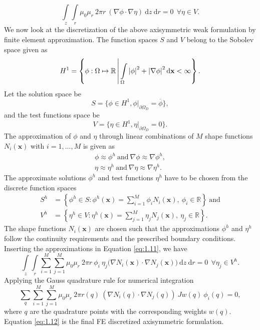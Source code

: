 \begin{equation}
\int\limits_{z} \int\limits_{r} \mu_0 \mu_r \ 2 \pi r \ (\nabla \phi \cdot \nabla \eta) \ \mathrm{d}z \ \mathrm{d}r = 0 \ \ \forall \eta \in V.
\label{eq:1.11}
\end{equation}
We now look at the discretization of the above axisymmetric weak formulation by finite element approximation. The function spaces $S$ and $V$ belong to the Sobolev space given as
\begin{equation}
H^1 = \left\lbrace \phi : \Omega \mapsto \mathbb{R} \,\middle\vert\, \int\limits_{\Omega} \left\lvert \phi \right\rvert^2 + \left\lvert \nabla \phi \right\rvert^2 \mathrm{d}\mathbf{x} < \infty \right\rbrace.
\end{equation}
Let the solution space be
\begin{equation}
S = \{ \phi \in H^1, \phi|_{\partial \Omega_{D}} = \overline{\phi} \},
\end{equation}
and the test functions space be
\begin{equation}
V = \{ \eta \in H^1, \eta|_{\partial \Omega_{D}} = 0\}.
\end{equation}
The approximation of $\phi$ and $\eta$ through linear combinations of $M$ shape functions $N_i (\mathbf{x})$ with $i =1,...,M$ is given as
\begin{align}
\phi \approx \phi^h \ \text{and} \ \nabla \phi \approx \nabla \phi^h, \nonumber\\
\eta \approx \eta^h \ \text{and} \ \nabla \eta \approx \nabla \eta^h.
\end{align}
The approximate solutions $\phi^h$ and test functions $\eta^h$ have to be chosen from the discrete function spaces 
\begin{align}
S^h &= \left\{\phi^h \in S : \phi^h(\textbf{x}) = \sum_{i=1}^{\textit{M}} \phi_i N_i (\textbf{x}), \ \phi_i \in \mathbb{R} \right\} \ \text{and} \nonumber\\
V^h &= \left\{\eta^h \in V : \eta^h(\textbf{x}) = \sum_{j=1}^{\textit{M}} \eta_j N_j (\textbf{x}), \ \eta_j \in \mathbb{R} \right\}.
\end{align}
The shape functions $N_i (\mathbf{x})$ are chosen such that the approximations $\phi^h$ and $\eta^h$ follow the continuity requirements and the prescribed boundary conditions. Inserting the approximations in Equation \eqref{eq:1.11}, we have
\begin{equation}
\int\limits_{z} \int\limits_{r} \sum\limits_{i=1}^{M} \sum\limits_{j=1}^{M} \mu_0 \mu_r \ 2 \pi r \ \phi_i \ \eta_j \Big( \nabla N_i (\mathbf{x}) \cdot \nabla N_j (\mathbf{x}) \Big) \ \mathrm{d}z \ \mathrm{d}r = 0 \ \ \forall \eta_j \in V^h.
\end{equation}
Applying the Gauss quadrature rule for numerical integration
\begin{equation}
\sum\limits_{q} \sum\limits_{i=1}^{M} \sum\limits_{j=1}^{M} \mu_0 \mu_r \ 2 \pi r(q) \ (\nabla N_i (q) \cdot \nabla N_j (q)) \ J w(q) \ \phi_i(q)= 0,
\label{eq:1.12}
\end{equation}
where $q$ are the quadrature points with the corresponding weights $w(q)$. Equation \eqref{eq:1.12} is the final FE discretized axisymmetric formulation.

